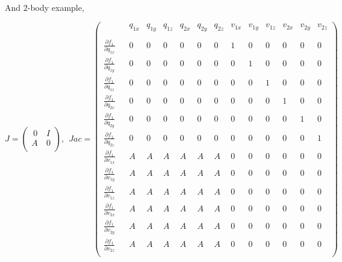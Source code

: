 \paragraph*{}
And 2-body example,

\begin{equation}
J=\left(\begin{array}{cc}
  \ 0 & \ I \\
    A & \ 0 \\
\end{array}\right), \ \
Jac=\left(\begin{array}{ccccccccccccccc}
   & & q_{1x}  & q_{1y} & q_{1z}  & q_{2x}  & q_{2y} & q_{2z} & v_{1x}  & v_{1y} & v_{1z}  & v_{2x} & v_{2y} & v_{2z}  \\
   \\
   \frac{\partial f_1}{\partial q_{1x}} & & 0 & 0   & 0  & 0  & 0   & 0 & 1  &  0  & 0 & 0 & 0   & 0 \\
   \frac{\partial f_1}{\partial q_{1y}} & & 0 & 0   & 0  & 0  & 0   & 0 & 0  &  1  & 0 & 0 & 0   & 0 \\
   \frac{\partial f_1}{\partial q_{1z}} & & 0 & 0   & 0  & 0  & 0   & 0 & 0  &  0  & 1 & 0 & 0   & 0 \\
   \frac{\partial f_1}{\partial q_{2x}} & & 0 & 0   & 0  & 0  & 0   & 0 & 0  &  0  & 0 & 1 & 0   & 0 \\
   \frac{\partial f_1}{\partial q_{2y}} & & 0 & 0   & 0  & 0  & 0   & 0 & 0  &  0  & 0 & 0 & 1   & 0 \\
   \frac{\partial f_1}{\partial q_{2z}} & & 0 & 0   & 0  & 0  & 0   & 0 & 0  &  0  & 0 & 0 & 0   & 1 \\
   
   \frac{\partial f_1}{\partial v_{1x}} & & A & A   & A  & A  & A   & A & 0  &  0  & 0 & 0 & 0   & 0 \\
   \frac{\partial f_1}{\partial v_{1y}} & & A & A   & A  & A  & A   & A & 0  &  0  & 0 & 0 & 0   & 0 \\
   \frac{\partial f_1}{\partial v_{1z}} & & A & A   & A  & A  & A   & A & 0  &  0  & 0 & 0 & 0   & 0 \\
   \frac{\partial f_1}{\partial v_{2x}} & & A & A   & A  & A  & A   & A & 0  &  0  & 0 & 0 & 0   & 0 \\
   \frac{\partial f_1}{\partial v_{2y}} & & A & A   & A  & A  & A   & A & 0  &  0  & 0 & 0 & 0   & 0 \\
   \frac{\partial f_1}{\partial v_{2z}} & & A & A   & A  & A  & A   & A & 0  &  0  & 0 & 0 & 0   & 0 \\
  \end{array}\right)  
\end{equation}

